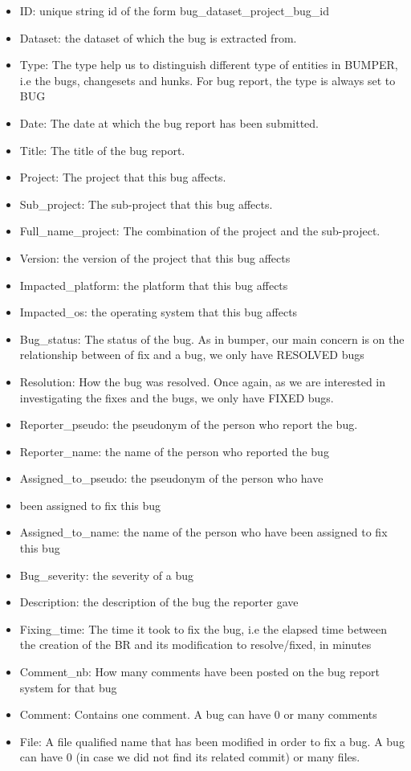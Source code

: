 \begin{itemize}

\item ID: unique string id of the form bug\_dataset\_project\_bug\_id
\item Dataset: the dataset of which the bug is extracted from.
\item Type: The type help us to distinguish different type of entities in BUMPER, i.e the bugs, changesets and hunks. For bug report, the type is always set to BUG
\item Date: The date at which the bug report has been submitted.
\item Title: The title of the bug report.
\item Project: The project that this bug affects.
\item Sub\_project: The sub-project that this bug affects.
\item Full\_name\_project: The combination of the project and the sub-project.
\item Version: the version of the project that this bug affects
\item Impacted\_platform: the platform that this bug affects
\item Impacted\_os: the operating system that this bug affects
\item Bug\_status: The status of the bug. As in bumper, our main concern is on the relationship between of fix and a bug, we only have RESOLVED bugs
\item Resolution: How the bug was resolved. Once again, as we are interested in investigating the fixes and the bugs, we only have FIXED bugs.
\item Reporter\_pseudo: the pseudonym of the person who report the bug.
\item Reporter\_name: the name of the person who reported the bug
\item Assigned\_to\_pseudo: the pseudonym of the person who have \item been assigned to fix this bug
\item Assigned\_to\_name: the name of the person who have been assigned to fix this bug
\item Bug\_severity: the severity of a bug
\item Description: the description of the bug the reporter gave
\item Fixing\_time: The time it took to fix the bug, i.e the elapsed time between the creation of the BR and its modification to resolve/fixed, in minutes
\item Comment\_nb: How many comments have been posted on the bug report system for that bug
\item Comment: Contains one comment. A bug can have 0 or many comments
\item File: A file qualified name that has been modified in order to fix a bug. A bug can have 0 (in case we did not find its related commit) or many files.

\end{itemize}

